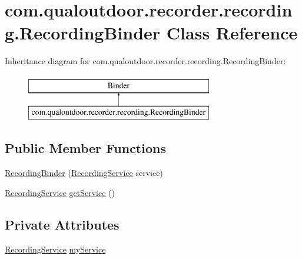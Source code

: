 \hypertarget{classcom_1_1qualoutdoor_1_1recorder_1_1recording_1_1RecordingBinder}{\section{com.\-qualoutdoor.\-recorder.\-recording.\-Recording\-Binder Class Reference}
\label{classcom_1_1qualoutdoor_1_1recorder_1_1recording_1_1RecordingBinder}
}
Inheritance diagram for com.\-qualoutdoor.\-recorder.\-recording.\-Recording\-Binder\-:\begin{figure}[H]
\begin{center}
\leavevmode
\includegraphics[height=2.000000cm]{classcom_1_1qualoutdoor_1_1recorder_1_1recording_1_1RecordingBinder}
\end{center}
\end{figure}
\subsection*{Public Member Functions}
\begin{DoxyCompactItemize}
\item 
\hyperlink{classcom_1_1qualoutdoor_1_1recorder_1_1recording_1_1RecordingBinder_a0d1cf5218f0acaff5461f1100f3b720d}{Recording\-Binder} (\hyperlink{classcom_1_1qualoutdoor_1_1recorder_1_1recording_1_1RecordingService}{Recording\-Service} service)
\item 
\hyperlink{classcom_1_1qualoutdoor_1_1recorder_1_1recording_1_1RecordingService}{Recording\-Service} \hyperlink{classcom_1_1qualoutdoor_1_1recorder_1_1recording_1_1RecordingBinder_aff514d1f17f94939e98fbdbcbe6f9426}{get\-Service} ()
\end{DoxyCompactItemize}
\subsection*{Private Attributes}
\begin{DoxyCompactItemize}
\item 
\hyperlink{classcom_1_1qualoutdoor_1_1recorder_1_1recording_1_1RecordingService}{Recording\-Service} \hyperlink{classcom_1_1qualoutdoor_1_1recorder_1_1recording_1_1RecordingBinder_a7db3901b1d36399d4f7f1c96ee328266}{my\-Service}
\end{DoxyCompactItemize}


